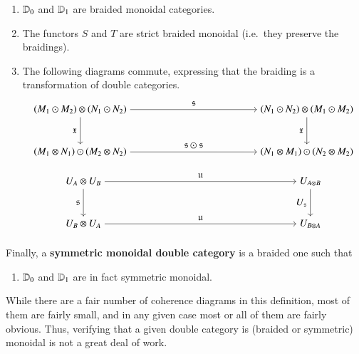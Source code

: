 \begin{enumerate}\setcounter{enumi}{\value{mondbl}}
\item $\mathbb{D}_0$ and $\mathbb{D}_1$ are braided monoidal categories.
\item The functors $S$ and $T$ are strict braided monoidal (i.e.\ they
  preserve the braidings).
\item \label{eq:braid1} The following diagrams commute, expressing that the braiding is
  a transformation of double categories. 
  \begin{equation}\label{eq:brmondoub1}
\begin{aligned}
\begin{tikzpicture}[xscale=2, yscale=1.5]
\node (tl) at (0,2) {$(M_1 \odot M_2) \tens (N_1 \odot N_2)$};
\node (tr) at (4,2) {$(N_1 \odot N_2) \tens (M_1 \odot M_2)$};
\node (ml) at (0,1) {$(M_1 \tens N_1) \odot (M_2 \tens N_2)$};
\node (mr) at (4,1) {$(N_1 \tens M_1) \odot (N_2 \tens M_2)$};
\draw[->] (tl) to node[above] {$\fs$} (tr);
\draw[->] (tl) to node[left]{$\fx$} (ml);
\draw[->] (tr) to node[left]{$\fx$} (mr);
\draw[->] (ml) to node[above] {$\fs \odot \fs$} (mr);
\end{tikzpicture}
    \end{aligned}
\end{equation}
 \begin{equation}\label{eq:brmondoub2}
\begin{aligned}
\begin{tikzpicture}[xscale=2, yscale=1.5]
\node (tl) at (0,2) {$U_A \tens U_B$};
\node (tr) at (4,2) {$U_{A \tens B}$};
\node (ml) at (0,1) {$U_B \tens U_A$};
\node (mr) at (4,1) {$U_{B \tens A}$};
\draw[->] (tl) to node[above] {$\fu$} (tr);
\draw[->] (tl) to node[left]{$\fs$} (ml);
\draw[->] (tr) to node[left]{$U_{\fs}$} (mr);
\draw[->] (ml) to node[above] {$\fu$} (mr);
\end{tikzpicture}
    \end{aligned}
\end{equation}

  \setcounter{mondbl}{\value{enumi}}
\end{enumerate}
Finally, a \textbf{symmetric monoidal double category} is a braided one such that
\begin{enumerate}\setcounter{enumi}{\value{mondbl}}
\item $\mathbb{D}_0$ and $\mathbb{D}_1$ are in fact symmetric monoidal.
\end{enumerate}
While there are a fair number of coherence diagrams in this definition, most of
them are fairly small, and in any given case most or all of them are
fairly obvious.  Thus, verifying that a given double category is
(braided or symmetric) monoidal is not a great deal of work.

